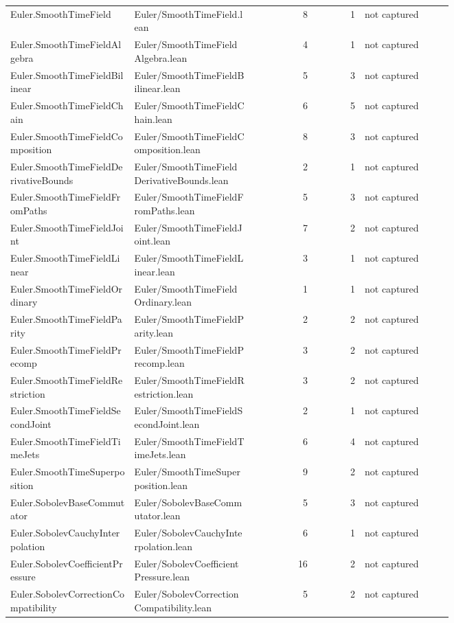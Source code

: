 \documentclass[10pt]{article}
\begin{document}
\begin{longtable}{p{0.28\linewidth}p{0.27\linewidth}r r p{0.20\linewidth}}
Euler.SmoothTimeField & Euler/SmoothTimeField.lean & 8 & 1 & not captured\\
Euler.SmoothTimeFieldAlgebra & Euler/SmoothTimeFieldAlgebra.lean & 4 & 1 & not captured\\
Euler.SmoothTimeFieldBilinear & Euler/SmoothTimeFieldBilinear.lean & 5 & 3 & not captured\\
Euler.SmoothTimeFieldChain & Euler/SmoothTimeFieldChain.lean & 6 & 5 & not captured\\
Euler.SmoothTimeFieldComposition & Euler/SmoothTimeFieldComposition.lean & 8 & 3 & not captured\\
Euler.SmoothTimeFieldDerivativeBounds & Euler/SmoothTimeFieldDerivativeBounds.lean & 2 & 1 & not captured\\
Euler.SmoothTimeFieldFromPaths & Euler/SmoothTimeFieldFromPaths.lean & 5 & 3 & not captured\\
Euler.SmoothTimeFieldJoint & Euler/SmoothTimeFieldJoint.lean & 7 & 2 & not captured\\
Euler.SmoothTimeFieldLinear & Euler/SmoothTimeFieldLinear.lean & 3 & 1 & not captured\\
Euler.SmoothTimeFieldOrdinary & Euler/SmoothTimeFieldOrdinary.lean & 1 & 1 & not captured\\
Euler.SmoothTimeFieldParity & Euler/SmoothTimeFieldParity.lean & 2 & 2 & not captured\\
Euler.SmoothTimeFieldPrecomp & Euler/SmoothTimeFieldPrecomp.lean & 3 & 2 & not captured\\
Euler.SmoothTimeFieldRestriction & Euler/SmoothTimeFieldRestriction.lean & 3 & 2 & not captured\\
Euler.SmoothTimeFieldSecondJoint & Euler/SmoothTimeFieldSecondJoint.lean & 2 & 1 & not captured\\
Euler.SmoothTimeFieldTimeJets & Euler/SmoothTimeFieldTimeJets.lean & 6 & 4 & not captured\\
Euler.SmoothTimeSuperposition & Euler/SmoothTimeSuperposition.lean & 9 & 2 & not captured\\
Euler.SobolevBaseCommutator & Euler/SobolevBaseCommutator.lean & 5 & 3 & not captured\\
Euler.SobolevCauchyInterpolation & Euler/SobolevCauchyInterpolation.lean & 6 & 1 & not captured\\
Euler.SobolevCoefficientPressure & Euler/SobolevCoefficientPressure.lean & 16 & 2 & not captured\\
Euler.SobolevCorrectionCompatibility & Euler/SobolevCorrectionCompatibility.lean & 5 & 2 & not captured\\

\end{longtable}
\end{document}
